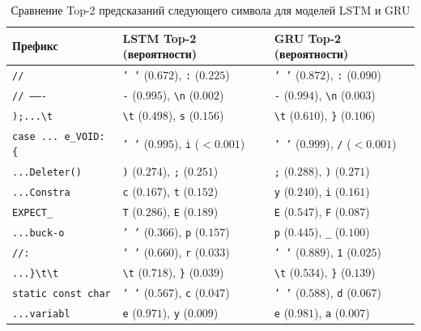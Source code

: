 \begin{table}[H]
\centering
\caption{Сравнение Top-2 предсказаний следующего символа для моделей LSTM и GRU}
\label{tab:compare_top2}
\small
\begin{tabular}{p{}|p{}|p{}}
\hline
\textbf{Префикс} &
\textbf{LSTM Top-2 (вероятности)} &
\textbf{GRU Top-2 (вероятности)} \\
\hline

\texttt{//} &
\texttt{' '} ($0.672$), \texttt{:} ($0.225$) &
\texttt{' '} ($0.872$), \texttt{:} ($0.090$) \\
\hline

\texttt{// -------} &
\texttt{-} ($0.995$), \texttt{\textbackslash n} ($0.002$) &
\texttt{-} ($0.994$), \texttt{\textbackslash n} ($0.003$) \\
\hline

\texttt{);...\textbackslash t} &
\texttt{\textbackslash t} ($0.498$), \texttt{s} ($0.156$) &
\texttt{\textbackslash t} ($0.610$), \texttt{\}} ($0.106$) \\
\hline

\texttt{case ... e\_VOID: \{} &
\texttt{' '} ($0.995$), \texttt{i} ($<0.001$) &
\texttt{' '} ($0.999$), \texttt{/} ($<0.001$) \\
\hline

\texttt{...Deleter()} &
\texttt{)} ($0.274$), \texttt{;} ($0.251$) &
\texttt{;} ($0.288$), \texttt{)} ($0.271$) \\
\hline

\texttt{...Constra} &
\texttt{c} ($0.167$), \texttt{t} ($0.152$) &
\texttt{y} ($0.240$), \texttt{i} ($0.161$) \\
\hline

\texttt{EXPECT\_} &
\texttt{T} ($0.286$), \texttt{E} ($0.189$) &
\texttt{E} ($0.547$), \texttt{F} ($0.087$) \\
\hline

\texttt{...buck-o} &
\texttt{' '} ($0.366$), \texttt{p} ($0.157$) &
\texttt{p} ($0.445$), \texttt{\_} ($0.100$) \\
\hline

\texttt{//: } &
\texttt{' '} ($0.660$), \texttt{r} ($0.033$) &
\texttt{' '} ($0.889$), \texttt{1} ($0.025$) \\
\hline

\texttt{...\}\textbackslash t\textbackslash t} &
\texttt{\textbackslash t} ($0.718$), \texttt{\}} ($0.039$) &
\texttt{\textbackslash t} ($0.534$), \texttt{\}} ($0.139$) \\
\hline

\texttt{static const char} &
\texttt{' '} ($0.567$), \texttt{c} ($0.047$) &
\texttt{' '} ($0.588$), \texttt{d} ($0.067$) \\
\hline

\texttt{...variabl} &
\texttt{e} ($0.971$), \texttt{y} ($0.009$) &
\texttt{e} ($0.981$), \texttt{a} ($0.007$) \\
\hline

\end{tabular}
\end{table}

